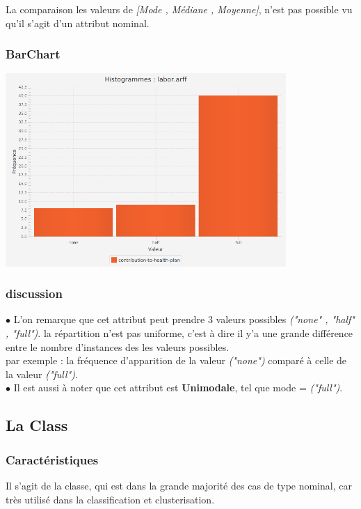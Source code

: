 \documentclass[12pt,a4paper,oneside]{book}
\begin{document}
	La comparaison les valeurs de \textit{[Mode , Médiane , Moyenne]}, n'est pas possible vu qu'il s'agit d'un attribut nominal.
	
	\subsubsection{BarChart}
	
	\begin{center}
		\includegraphics[width=0.8\textwidth]{screens/barchart/contribution-to-health-plan-barchart.png}%
		\label{labelname}%
	\end{center}
	
	\subsubsection{discussion}
	$\bullet $ L'on remarque que cet attribut peut prendre 3 valeurs possibles \textit{("none" , "half" , "full")}. la répartition n'est pas uniforme, c'est à dire il y'a une grande différence entre le nombre d'instances des les valeurs possibles.\\
	par exemple : la fréquence d'apparition de la valeur \textit{("none")} comparé à celle de la valeur \textit{("full")}.\\
	$\bullet $ Il est aussi à noter que cet attribut est \textbf{Unimodale}, tel que mode = \textit{("full")}.
	
	\newpage
	
	\subsection{La Class }
	\subsubsection{Caractéristiques}
	Il s'agit de la classe, qui est dans la grande majorité des cas de type nominal, car très utilisé dans la classification et clusterisation.
	
\end{document}
